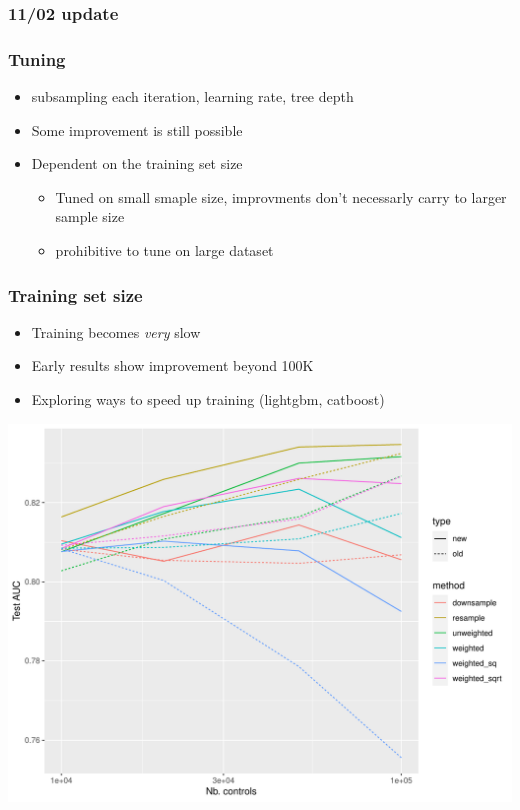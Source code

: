 \documentclass[12pt]{article}
\begin{document}
\pagebreak
\subsubsection*{11/02 update}


\subsubsection*{Tuning}

\begin{itemize}
	\item subsampling each iteration, learning rate, tree depth
	\item Some improvement is still possible
	\item Dependent on the training set size
	\begin{itemize}
		\item Tuned on small smaple size, improvments don't necessarly carry to larger sample size
		\item prohibitive to tune on large dataset
	\end{itemize}
\end{itemize}


\subsubsection*{Training set size}

\begin{itemize}
	\item Training becomes \textit{very} slow
	\item Early results show improvement beyond 100K
	\item Exploring ways to speed up training (lightgbm, catboost)
\end{itemize}



\newpage
\begin{center}
\includegraphics[width=.9\textwidth]{aucs_large_test_new.pdf}
\end{center}
\end{document}
